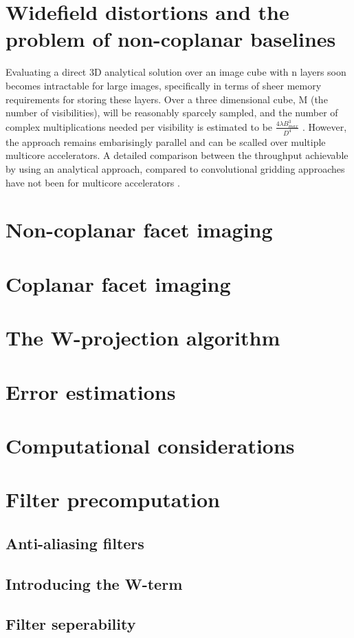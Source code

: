 \section{Widefield distortions and the problem of non-coplanar baselines}
Evaluating a direct 3D analytical solution over an image cube with n layers soon becomes intractable for large images, specifically in terms of sheer memory requirements for storing these layers. Over a three dimensional cube, M (the number of visibilities),
will be reasonably sparcely sampled, and the number of complex multiplications needed per visibility is estimated to be $\frac{4\lambda B_{max}^3}{D^4}$ \cite{yashar2009tdp}. However, the approach remains embarisingly parallel and can
be scalled over multiple multicore accelerators. A detailed comparison between the throughput achievable by using an analytical approach, compared to convolutional gridding approaches have not been for multicore accelerators \cite{hardy2013direct}.
\section{Non-coplanar facet imaging}
\section{Coplanar facet imaging}
\section{The W-projection algorithm}
\section{Error estimations}
\section{Computational considerations}
\section{Filter precomputation}
\subsection{Anti-aliasing filters}
\subsection{Introducing the W-term}
\subsection{Filter seperability}
